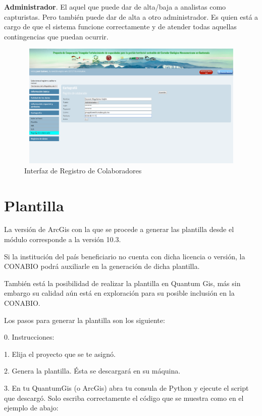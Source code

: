 \documentclass[twoside]{book}
\begin{document}
\textbf{Administrador}. El aquel que puede dar de alta/baja a analistas como capturistas. Pero también puede dar de alta a otro administrador. Es quien está a cargo de que el sistema funcione correctamente y de atender todas aquellas contingencias que puedan ocurrir.

\begin{figure}[h!] %
	\includegraphics[width=12cm, height=6cm]{img/registroColaboradores} %
	\caption{Interfaz de Registro de Colaboradores}
\end{figure}


\section{Plantilla}


La versión de ArcGis con la que se procede a generar las plantilla desde el módulo corresponde a la versión 10.3.

Si la institución del país beneficiario no cuenta con dicha licencia o versión, la CONABIO podrá auxiliarle en la generación de dicha plantilla.

También está la posibilidad de realizar la plantilla en Quantum Gis, más sin embargo su calidad aún está en exploración para su posible inclusión en la CONABIO.

Los pasos para generar la plantilla son los siguiente:

0. Instrucciones:

1. Elija el proyecto que se te asignó.

2. Genera la plantilla. Ésta se descargará en su máquina.

3. En tu QuantumGis (o ArcGis) abra tu consula de Python y ejecute el script que descargó. Solo escriba correctamente el código que se muestra como en el ejemplo de abajo:
\end{document}
